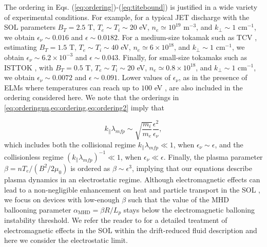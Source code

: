 The ordering in Eqs. (\ref{eq:ordering})-(\ref{eq:titebound}) is justified in a wide variety of experimental conditions. For example, for a typical JET discharge \citep{Erents2000,Liang2007,Xu2009} with the SOL parameters $B_T = 2.5$ T, $T_e \sim T_i \sim 20$ eV, $n_e \simeq 10^{19}$ m$^{-3}$, and $k_\perp \sim 1$ cm$^{-1}$, we obtain $\epsilon_\nu \sim 0.016$ and $\epsilon \sim 0.0182$. For a medium-size tokamak such as TCV \citep{Rossel2012,Nespoli2017}, estimating  $B_T = 1.5$ T, $T_e \sim T_i \sim 40$ eV, $n_e \simeq 6 \times 10^{18}$, and $k_\perp \sim 1$ cm$^{-1}$, we obtain $\epsilon_\nu \sim 6.2 \times 10^{-3}$ and $\epsilon \sim 0.043$. Finally, for small-size tokamaks such as ISTTOK \citep{Silva2011a,Jorge2016}, with $B_T = 0.5$ T, $T_e \sim T_i \sim 20$ eV, $n_e \simeq 0.8 \times 10^{18}$, and $k_\perp \sim 1$ cm$^{-1}$, we obtain $\epsilon_\nu \sim 0.0072$ and $\epsilon \sim 0.091$. Lower values of $\epsilon_\nu$, as in the presence of ELMs where temperatures can reach up to $100$ eV \citep{Pitts2003}, are also included in the ordering considered here.
%
%
%
%
We note that the orderings in \cref{eq:orderingnu,eq:ordering,eq:ordering2} imply that

\begin{equation}
    k_\parallel \lambda_{mfp} \sim \sqrt{\frac{m_i}{m_e}}\frac{\epsilon^2}{\epsilon_\nu},
    \label{eq:kparlmfp}
\end{equation}
%
which includes both the collisional regime $k_{\parallel} \lambda_{mfp} \ll 1$, when $\epsilon_\nu \sim \epsilon$, and the collisionless regime $(k_{\parallel} \lambda_{mfp})^{-1} \ll 1$, when $\epsilon_\nu \ll \epsilon$.
%
Finally, the plasma parameter $\beta = n T_e/(B^2/2\mu_0)$ is ordered as $\beta \sim \epsilon^3$, {implying that our equations describe plasma dynamics in an electrostatic regime}.
%
Although electromagnetic effects can lead to a non-negligible enhancement on heat and particle transport in the SOL \citep{LaBombard2005}, we focus on devices with low-enough $\beta$ such that the value of the MHD ballooning parameter $\alpha_{\text{MHD}} = \beta R/L_p$ stays below the electromagnetic balloning instability threshold.
%
We refer the reader to \citet{Halpern2013a} for a detailed treatment of electromagnetic effects in the SOL within the drift-reduced fluid description and here we consider the electrostatic limit.

